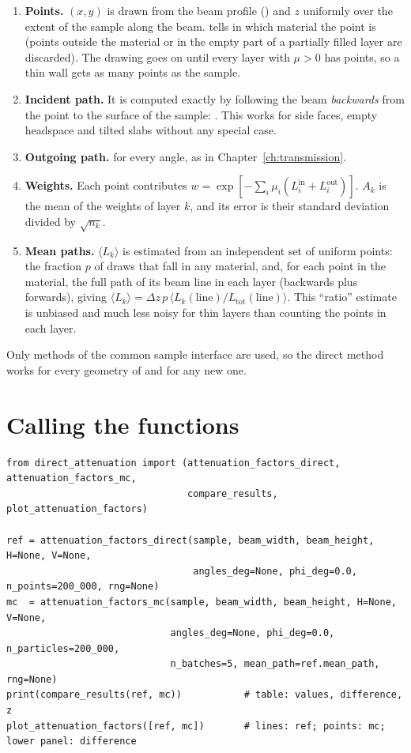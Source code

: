 \begin{enumerate}
  \item \textbf{Points.} $(x,y)$ is drawn from the beam profile () and $z$ uniformly over the extent of the sample along the beam.
         tells in which material the point is (points outside the material or in the empty part of a partially filled layer
        are discarded). The drawing goes on until every layer with $\mu>0$ has  points, so a thin wall gets as many points as the
        sample.
  \item \textbf{Incident path.} It is computed exactly by following the beam \emph{backwards} from the point to the surface of the sample:
        . This works for side faces, empty headspace and tilted slabs without any special case.
  \item \textbf{Outgoing path.}  for every angle, as in Chapter~\ref{ch:transmission}.
  \item \textbf{Weights.} Each point contributes $w=\exp[-\sum_i\mu_i(L^{\mathrm{in}}_i+L^{\mathrm{out}}_i)]$. $A_k$ is the mean of the weights of
        layer $k$, and its error is their standard deviation divided by $\sqrt{n_k}$.
  \item \textbf{Mean paths.} $\langle L_k\rangle$ is estimated from an independent set of uniform points: the fraction $p$ of draws that fall in any
        material, and, for each point in the material, the full path of its beam line in each layer (backwards plus forwards), giving
        $\langle L_k\rangle=\Delta z\,p\,\langle L_k(\text{line})/L_{\mathrm{tot}}(\text{line})\rangle$. This ``ratio'' estimate is unbiased and
        much less noisy for thin layers than counting the points in each layer.
\end{enumerate}
Only methods of the common sample interface are used, so the direct method works for every geometry of \mcams{} and for any new one.

\section{Calling the functions}

\begin{lstlisting}
from direct_attenuation import (attenuation_factors_direct, attenuation_factors_mc,
                                compare_results, plot_attenuation_factors)

ref = attenuation_factors_direct(sample, beam_width, beam_height, H=None, V=None,
                                 angles_deg=None, phi_deg=0.0, n_points=200_000, rng=None)
mc  = attenuation_factors_mc(sample, beam_width, beam_height, H=None, V=None,
                             angles_deg=None, phi_deg=0.0, n_particles=200_000,
                             n_batches=5, mean_path=ref.mean_path, rng=None)
print(compare_results(ref, mc))           # table: values, difference, z
plot_attenuation_factors([ref, mc])       # lines: ref; points: mc; lower panel: difference
\end{lstlisting}


